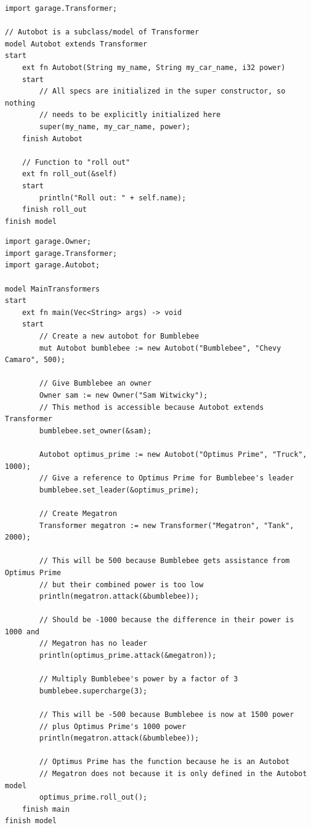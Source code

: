 \documentclass[letterpaper, 10pt, DIV=13]{scrartcl}
\numberwithin{equation}{section}
\numberwithin{figure}{section}
\numberwithin{table}{section}
\begin{document}
\begin{lstlisting}[caption = Autobot.rez, frame = single, nolol]
import garage.Transformer;

// Autobot is a subclass/model of Transformer
model Autobot extends Transformer
start
    ext fn Autobot(String my_name, String my_car_name, i32 power)
    start
        // All specs are initialized in the super constructor, so nothing
        // needs to be explicitly initialized here
        super(my_name, my_car_name, power);
    finish Autobot

    // Function to "roll out"
    ext fn roll_out(&self)
    start
        println("Roll out: " + self.name);
    finish roll_out
finish model
\end{lstlisting}

\begin{lstlisting}[caption = MainTransformers.rez, frame = single, nolol]
import garage.Owner;
import garage.Transformer;
import garage.Autobot;

model MainTransformers
start
    ext fn main(Vec<String> args) -> void
    start
        // Create a new autobot for Bumblebee
        mut Autobot bumblebee := new Autobot("Bumblebee", "Chevy Camaro", 500);

        // Give Bumblebee an owner
        Owner sam := new Owner("Sam Witwicky");
        // This method is accessible because Autobot extends Transformer
        bumblebee.set_owner(&sam);

        Autobot optimus_prime := new Autobot("Optimus Prime", "Truck", 1000);
        // Give a reference to Optimus Prime for Bumblebee's leader
        bumblebee.set_leader(&optimus_prime);

        // Create Megatron
        Transformer megatron := new Transformer("Megatron", "Tank", 2000);
        
        // This will be 500 because Bumblebee gets assistance from Optimus Prime
        // but their combined power is too low
        println(megatron.attack(&bumblebee));
        
        // Should be -1000 because the difference in their power is 1000 and
        // Megatron has no leader
        println(optimus_prime.attack(&megatron));

        // Multiply Bumblebee's power by a factor of 3
        bumblebee.supercharge(3);

        // This will be -500 because Bumblebee is now at 1500 power
        // plus Optimus Prime's 1000 power
        println(megatron.attack(&bumblebee));

        // Optimus Prime has the function because he is an Autobot
        // Megatron does not because it is only defined in the Autobot model
        optimus_prime.roll_out();
    finish main
finish model
\end{lstlisting}
\end{document}
